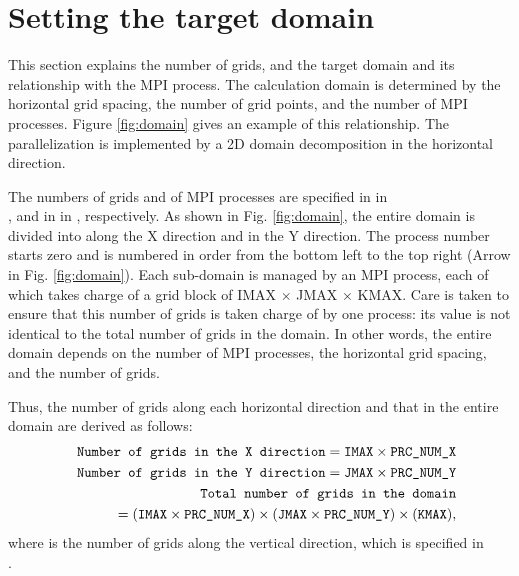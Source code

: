 \section{Setting the target domain} \label{sec:domain}

This section explains the number of grids, and the target domain and its relationship with the MPI process. The calculation domain is determined by the horizontal grid spacing, the number of grid points, and the number of MPI processes. Figure \ref{fig:domain} gives an example of this relationship. The parallelization is implemented by a 2D domain decomposition in the horizontal direction.

The numbers of grids and of MPI processes are specified in  in\\
, and in  in , respectively. As shown in Fig. \ref{fig:domain},  the entire domain is divided into  along the X direction and  in the Y direction.
The process number starts zero and is numbered in order from the bottom left to the top right (Arrow in Fig. \ref{fig:domain}).
Each sub-domain is managed by an MPI process, each of which takes charge of a grid block of IMAX $\times$ JMAX $\times$ KMAX. Care is taken to ensure that this number of grids is taken charge of by one process: its value is not identical to the total number of grids in the domain. In other words, the entire domain depends on the number of MPI processes, the horizontal grid spacing, and the number of grids.

Thus, the number of grids along each horizontal direction and that in the entire domain are derived as follows:
\begin{eqnarray}
&& \verb|Number of grids in the X direction| = \verb|IMAX| \times \verb|PRC_NUM_X|
   \label{eq:xgridnum}\\
&& \verb|Number of grids in the Y direction| = \verb|JMAX| \times \verb|PRC_NUM_Y|
   \label{eq:ygridnum}\\
&& \verb|Total number of grids in the domain| \nonumber\\
&&\quad = \left(\verb|IMAX| \times \verb|PRC_NUM_X|\right)
          \times (\verb|JMAX| \times \verb|PRC_NUM_Y|)
          \times (\verb|KMAX| ),
\end{eqnarray}
where  is the number of grids along the vertical direction, which is specified in\\
.

